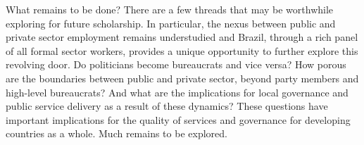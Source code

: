 What remains to be done? There are a few threads that may be worthwhile exploring for future scholarship. In particular, the nexus between public and private sector employment remains understudied and Brazil, through a rich panel of all formal sector workers, provides a unique opportunity to further explore this revolving door. Do politicians become bureaucrats and vice versa? How porous are the boundaries between public and private sector, beyond party members and high-level bureaucrats? And what are the implications for local governance and public service delivery as a result of these dynamics? These questions have important implications for the quality of services and governance for developing countries as a whole. Much remains to be explored.